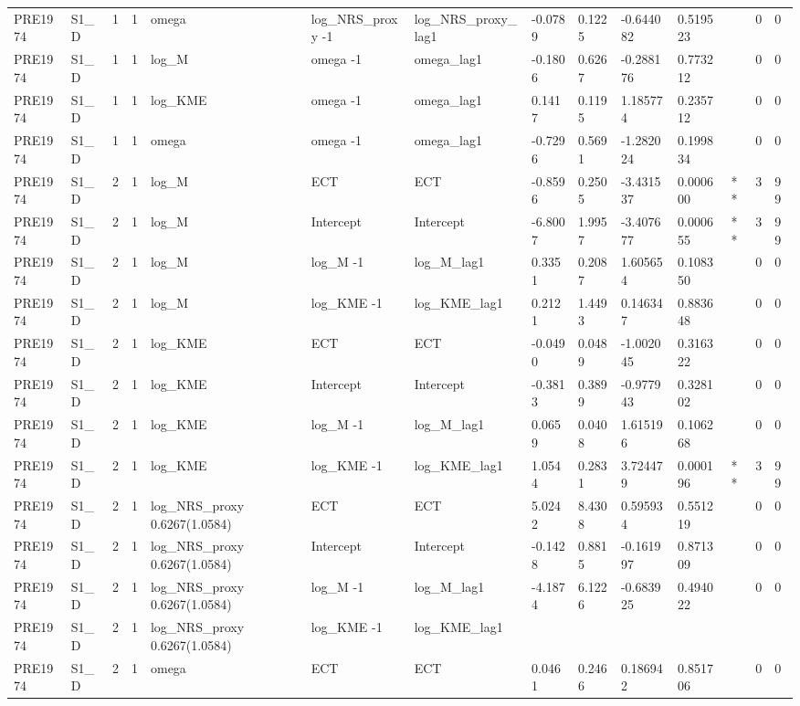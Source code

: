 \begin{tabular}{llllllllllllll}
PRE1974 & S1\_D & 1 & 1 & omega & log\_NRS\_proxy -1 & log\_NRS\_proxy\_lag1 & -0.0789 & 0.1225 & -0.644082 & 0.519523 &  & 0 & 0 \\
PRE1974 & S1\_D & 1 & 1 & log\_M & omega -1 & omega\_lag1 & -0.1806 & 0.6267 & -0.288176 & 0.773212 &  & 0 & 0 \\
PRE1974 & S1\_D & 1 & 1 & log\_KME & omega -1 & omega\_lag1 & 0.1417 & 0.1195 & 1.185774 & 0.235712 &  & 0 & 0 \\
PRE1974 & S1\_D & 1 & 1 & omega & omega -1 & omega\_lag1 & -0.7296 & 0.5691 & -1.282024 & 0.199834 &  & 0 & 0 \\
PRE1974 & S1\_D & 2 & 1 & log\_M & ECT & ECT & -0.8596 & 0.2505 & -3.431537 & 0.000600 & ** & 3 & 99 \\
PRE1974 & S1\_D & 2 & 1 & log\_M & Intercept & Intercept & -6.8007 & 1.9957 & -3.407677 & 0.000655 & ** & 3 & 99 \\
PRE1974 & S1\_D & 2 & 1 & log\_M & log\_M -1 & log\_M\_lag1 & 0.3351 & 0.2087 & 1.605654 & 0.108350 &  & 0 & 0 \\
PRE1974 & S1\_D & 2 & 1 & log\_M & log\_KME -1 & log\_KME\_lag1 & 0.2121 & 1.4493 & 0.146347 & 0.883648 &  & 0 & 0 \\
PRE1974 & S1\_D & 2 & 1 & log\_KME & ECT & ECT & -0.0490 & 0.0489 & -1.002045 & 0.316322 &  & 0 & 0 \\
PRE1974 & S1\_D & 2 & 1 & log\_KME & Intercept & Intercept & -0.3813 & 0.3899 & -0.977943 & 0.328102 &  & 0 & 0 \\
PRE1974 & S1\_D & 2 & 1 & log\_KME & log\_M -1 & log\_M\_lag1 & 0.0659 & 0.0408 & 1.615196 & 0.106268 &  & 0 & 0 \\
PRE1974 & S1\_D & 2 & 1 & log\_KME & log\_KME -1 & log\_KME\_lag1 & 1.0544 & 0.2831 & 3.724479 & 0.000196 & ** & 3 & 99 \\
PRE1974 & S1\_D & 2 & 1 & log\_NRS\_proxy 0.6267(1.0584) & ECT & ECT & 5.0242 & 8.4308 & 0.595934 & 0.551219 &  & 0 & 0 \\
PRE1974 & S1\_D & 2 & 1 & log\_NRS\_proxy 0.6267(1.0584) & Intercept & Intercept & -0.1428 & 0.8815 & -0.161997 & 0.871309 &  & 0 & 0 \\
PRE1974 & S1\_D & 2 & 1 & log\_NRS\_proxy 0.6267(1.0584) & log\_M -1 & log\_M\_lag1 & -4.1874 & 6.1226 & -0.683925 & 0.494022 &  & 0 & 0 \\
PRE1974 & S1\_D & 2 & 1 & log\_NRS\_proxy 0.6267(1.0584) & log\_KME -1 & log\_KME\_lag1 &  &  &  &  &  &  &  \\
PRE1974 & S1\_D & 2 & 1 & omega & ECT & ECT & 0.0461 & 0.2466 & 0.186942 & 0.851706 &  & 0 & 0 \\

\end{tabular}
